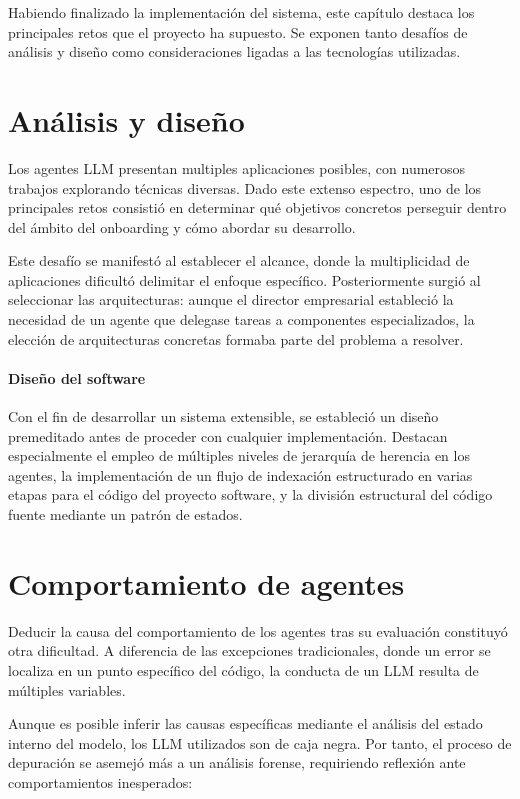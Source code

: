 Habiendo finalizado la implementación del sistema, este capítulo destaca los principales retos que el proyecto ha supuesto. Se exponen tanto desafíos de análisis y diseño como consideraciones ligadas a las tecnologías utilizadas. 

\section{Análisis y diseño}
Los agentes LLM presentan multiples aplicaciones posibles, con numerosos trabajos explorando técnicas diversas. Dado este extenso espectro, uno de los principales retos consistió en determinar qué objetivos concretos perseguir dentro del ámbito del onboarding y cómo abordar su desarrollo.

Este desafío se manifestó al establecer el alcance, donde la multiplicidad de aplicaciones dificultó delimitar el enfoque específico. Posteriormente surgió al seleccionar las arquitecturas: aunque el director empresarial estableció la necesidad de un agente que delegase tareas a componentes especializados, la elección de arquitecturas concretas formaba parte del problema a resolver.

\paragraph{Diseño del software}
Con el fin de desarrollar un sistema extensible, se estableció un diseño premeditado antes de proceder con cualquier implementación. Destacan especialmente el empleo de múltiples niveles de jerarquía de herencia en los agentes, la implementación de un flujo de indexación estructurado en varias etapas para el código del proyecto software, y la división estructural del código fuente mediante un patrón de estados.

\section{Comportamiento de agentes}
Deducir la causa del comportamiento de los agentes tras su evaluación constituyó otra dificultad. A diferencia de las excepciones tradicionales, donde un error se localiza en un punto específico del código, la conducta de un LLM resulta de múltiples variables.

Aunque es posible inferir las causas específicas mediante el análisis del estado interno del modelo, los LLM utilizados son de caja negra. Por tanto, el proceso de depuración se asemejó más a un análisis forense, requiriendo reflexión ante comportamientos inesperados:

